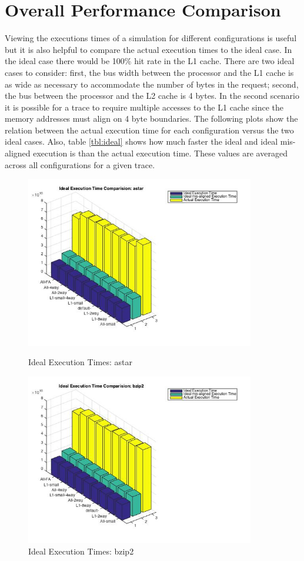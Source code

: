 \documentclass[11pt,titlepage]{article}
\begin{document}
\section{Overall Performance Comparison}
    Viewing the executions times of a simulation for different configurations is useful but it is also helpful to compare the actual execution times to the ideal case. In the ideal case there would be 100\% hit rate in the L1 cache. There are two ideal cases to consider: first, the bus width between the processor and the L1 cache is as wide as necessary to accommodate the number of bytes in the request; second, the bus between the processor and the L2 cache is 4 bytes. In the second scenario it is possible for a trace to require multiple accesses to the L1 cache since the memory addresses must align on 4 byte boundaries. The following plots show the relation between the actual execution time for each configuration versus the two ideal cases. Also, table \ref{tbl:ideal} shows how much faster the ideal and ideal mis-aligned execution is than the actual execution time. These values are averaged across all configurations for a given trace.
    \begin{figure}[H]
        \centering
        \begin{minipage}{.5\textwidth}
            \centering
            \includegraphics[width=10cm]{idealAstar}
            \caption{Ideal Execution Times: astar}
            \label{fig:idealA}
        \end{minipage}%
        \begin{minipage}{.5\textwidth}
            \centering
            \includegraphics[width=10cm]{idealBzip2}
            \caption{Ideal Execution Times: bzip2}
            \label{fig:idealB}
        \end{minipage}
    \end{figure}
\end{document}
